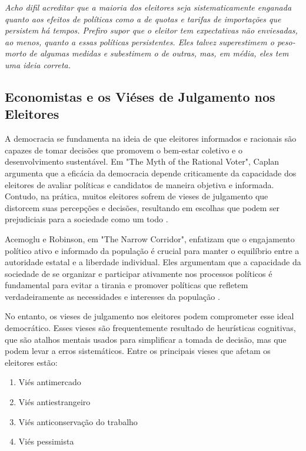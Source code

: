 \begin{citacao}
    \textit{Acho difil acreditar que a maioria dos eleitores seja sistematicamente enganada quanto aos efeitos de políticas como a de quotas e tarifas de importações que persistem há tempos. Prefiro supor que o eleitor tem expectativas não enviesadas, ao menos, quanto a essas políticas persistentes. Eles talvez superestimem o peso-morto de algumas medidas e subestimem o de outras, mas, em média, eles tem uma ideia correta.
    } \newline \cite{becker1976}
\end{citacao}

\subsection{Economistas e os Viéses de Julgamento nos Eleitores}

A democracia se fundamenta na ideia de que eleitores informados e racionais são capazes de tomar decisões que promovem o bem-estar coletivo e o desenvolvimento sustentável. Em "The Myth of the Rational Voter", Caplan argumenta que a eficácia da democracia depende criticamente da capacidade dos eleitores de avaliar políticas e candidatos de maneira objetiva e informada. Contudo, na prática, muitos eleitores sofrem de vieses de julgamento que distorcem suas percepções e decisões, resultando em escolhas que podem ser prejudiciais para a sociedade como um todo \cite{The_Myth_of_the_Rational_Voter}.

Acemoglu e Robinson, em "The Narrow Corridor", enfatizam que o engajamento político ativo e informado da população é crucial para manter o equilíbrio entre a autoridade estatal e a liberdade individual. Eles argumentam que a capacidade da sociedade de se organizar e participar ativamente nos processos políticos é fundamental para evitar a tirania e promover políticas que refletem verdadeiramente as necessidades e interesses da população \cite{acemoglu2019narrow}.

No entanto, os vieses de julgamento nos eleitores podem comprometer esse ideal democrático. Esses vieses são frequentemente resultado de heurísticas cognitivas, que são atalhos mentais usados para simplificar a tomada de decisão, mas que podem levar a erros sistemáticos. Entre os principais vieses que afetam os eleitores estão:

\begin{enumerate}
    \item Viés antimercado
    \item Viés antiestrangeiro
    \item Viés anticonservação do trabalho
    \item Viés pessimista
\end{enumerate}

